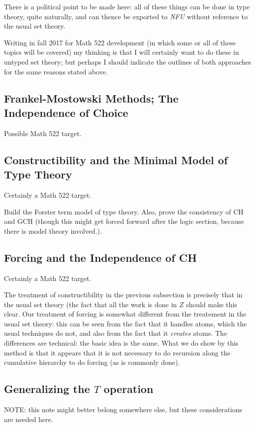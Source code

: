 \documentclass[12pt]{book}
\begin{document}
There is a political point to be made here: all of these things can be
done in type theory, quite naturally, and can thence be exported to
{\em NFU\/} without reference to the usual set theory.

Writing in fall 2017 for Math 522 development (in which some or all of these topics will be covered) my thinking is that I will certainly want to do these in untyped set theory;  but perhaps I should indicate the outlines of both approaches for the same reasons stated above.

\subsection{Frankel-Mostowski Methods; The Independence of Choice}  Possible Math 522 target.

\subsection{Constructibility and the Minimal Model of Type Theory}  Certainly a Math 522 target.

Build the Forster term model of type theory.  Also, prove the
consistency of CH and GCH (though this might get forced forward
after the logic section, because there is model theory involved.).

\subsection{Forcing and the Independence of CH}  Certainly a Math 522 target.

The treatment of constructibility in the previous subsection is
precisely that in the usual set theory (the fact that all the work is
done in $Z$ should make this clear.  Our treatment of forcing is
somewhat different from the treatement in the usual set theory: this
can be seen from the fact that it handles atoms, which the usual
techniques do not, and also from the fact that it {\em creates\/}
atoms.  The differences are technical: the basic idea is the same.
What we do show by this method is that it appears that it is not
necessary to do recursion along the cumulative hierarchy to do forcing
(as is commonly done).

\subsection{Generalizing the $T$ operation}

NOTE: this note might better belong somewhere else, but these
considerations are needed here.
\end{document}

